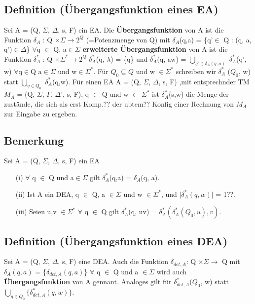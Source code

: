 \subsection{Definition (Übergangsfunktion eines EA)}
Sei A = (Q, $\Sigma$, $\Delta$, s, F) ein EA. Die \textbf{Übergangsfunktion} von A ist die Funktion $\delta_{A}$ : Q $\times \Sigma\rightarrow 2^{Q}$ (=Potenzmenge von Q) mit $\delta_{A}$(q,a) = \{q'$\in$ Q : (q, a, q')$\in \Delta$\} $\forall$q $\in$ Q, a$\in \Sigma$ \textbf{erweiterte Übergangsfunktion} von A ist die Funktion $\delta_{A}^{*}$ : Q $\times \Sigma^{*} \rightarrow 2^{Q}$ $\delta_{A}^{*}$(q, $\lambda$) = \{q\} und $\delta_{A}^{*}$(q, aw) = $\bigcup \limits_{q'\in \delta_{A}(q,a)}$ $\delta_{A}^{*}$(q', w) $\forall$q$\in$Q a$\in \Sigma$ und w$\in \Sigma^{*}$. Für $Q_{0} \subseteq Q$ und w $\in \Sigma^{*}$ schreiben wir $\delta_{A}^{*}$ ($Q_{0}$, w) statt $\bigcup \limits_{q \in Q_{0}}$ $\delta_{A}^{*}$(q,w). Für einen EA A = (Q, $\Sigma$, $\Delta$, s, F) ,mit entsprechnder TM $M_{A}$ = (Q, $\Sigma$, $\Gamma$, $\Delta$', s, F), q $\in$ Q und w $\in$ $\Sigma^{*}$ ist $\delta_{A}^{*}$(s,w) die Menge der zustände, die sich als erst Komp.?? der ubtem?? Konfig einer Rechnung von $M_{A}$ zur Eingabe zu ergeben.

\subsection{Bemerkung }
Sei A = (Q, $\Sigma$, $\Delta$, s, F) ein EA
\begin{itemize}
    \item [(i)] $\forall$ q $\in$ Q und a$\in \Sigma$ gilt $\delta_{A}^{*}$(q,a) = $\delta_{A}$(q, a).
    \item [(ii)] Ist A ein DEA, q $\in$ Q, a $\in \Sigma$ und w $\in \Sigma^{*}$, und $\lvert \delta_{A}^{*}(q,w) \rvert$ = 1??.
    \item[(iii)] Seien u,v $\in \Sigma^{*}$ $\forall$ q $\in$ Q gilt $\delta_{A}^{*}$(q, uv) = $\delta_{A}^{*}(\delta_{A}^{*}(Q_{0}, u), v)$.
\end{itemize}

\subsection{Definition (Übergangsfunktion eines DEA)}
Sei A = (Q, $\Sigma$,  $\Delta$, s, F) eine DEA. Auch die Funktion $\delta_{det, A}$: Q $\times \Sigma \rightarrow$ Q mit $\delta_{A}(q,a)$ = \{$\delta_{det, A}(q, a)$\} $\forall$ q $\in$ Q und a $\in \Sigma$ wird auch \textbf{Übergangsfunktion} von A gennant. Analoges gilt für $\delta_{det, A}^{*}$($Q_{0}$, w) statt $\bigcup \limits_{q \in Q_{0}}\{\delta_{det, A}^{*}(q, w)\}$.

